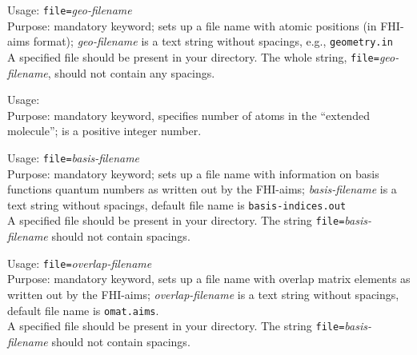 
{
 \noindent 
 Usage:  \quad  \texttt{file=}\textit{geo-filename} \\[1.0ex] 
 Purpose: mandatory keyword; sets up a file name with atomic positions 
 (in FHI-aims format); \textit{geo-filename} is a text string without spacings, 
 e.g., \texttt{geometry.in} \\
}
 A specified file should be present in your directory.  The whole string,
 \mbox{\texttt{file=}\textit{geo-filename}}, should not contain any
 spacings.


{
 \noindent 
 Usage: \quad {} \\[1.0ex]
 Purpose: mandatory keyword, specifies number of atoms in the ``extended
 molecule'';  is a positive integer number. \\
}


{
 \noindent Usage:  \quad 
 \texttt{file=}\textit{basis-filename} \\[1.0ex] 
 Purpose: mandatory keyword; sets up a file name with information on basis
 functions quantum numbers as written out by the FHI-aims;
 \textit{basis-filename} is a text string without spacings, default file
 name is \texttt{basis-indices.out} \\
}
A specified file should be present in your directory.  The string
\mbox{\texttt{file=}\textit{basis-filename}} should not contain spacings.

\clearpage

{
 \noindent Usage:   \quad
 \texttt{file=}\textit{overlap-filename} \\[1.0ex] 
 Purpose: mandatory keyword, sets up a file name with overlap 
 matrix elements as written out by the FHI-aims; \textit{overlap-filename} 
 is a text string without spacings, default file name is 
 \texttt{omat.aims}. \\
}
A specified file should be present in your directory.  The string
\mbox{\texttt{file=}\textit{basis-filename}} should not contain spacings.

